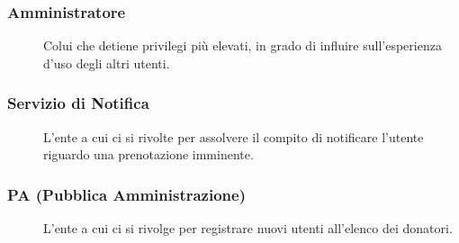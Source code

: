 \documentclass{article}
\begin{document}
\subsubsection{Amministratore}
\begin{description}
	\item[] Colui che detiene privilegi più elevati, in grado di influire sull'esperienza d'uso degli altri utenti.
\end{description}

\subsubsection{Servizio di Notifica}
\begin{description}
	\item[] L'ente a cui ci si rivolte per assolvere il compito di notificare l'utente riguardo una prenotazione imminente.
\end{description}

\subsubsection{PA (Pubblica Amministrazione)}
\begin{description}
	\item[] L'ente a cui ci si rivolge per registrare nuovi utenti all'elenco dei donatori.
\end{description}
\clearpage
\end{document}
